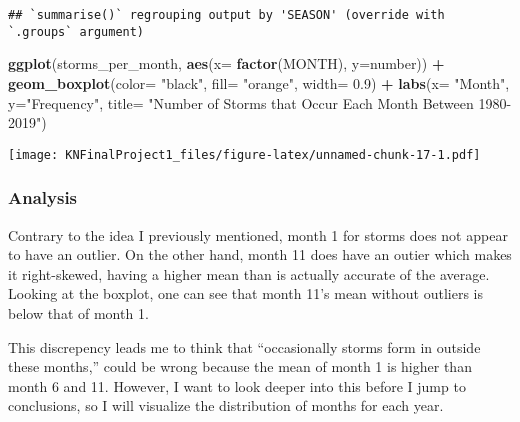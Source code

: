 \documentclass[
]{article}
\newenvironment{Shaded}{\begin{snugshade}}{\end{snugshade}}
\newcommand{\DataTypeTok}[1]{\textcolor[rgb]{0.13,0.29,0.53}{#1}}
\newcommand{\FloatTok}[1]{\textcolor[rgb]{0.00,0.00,0.81}{#1}}
\newcommand{\KeywordTok}[1]{\textcolor[rgb]{0.13,0.29,0.53}{\textbf{#1}}}
\newcommand{\NormalTok}[1]{#1}
\newcommand{\OperatorTok}[1]{\textcolor[rgb]{0.81,0.36,0.00}{\textbf{#1}}}
\newcommand{\StringTok}[1]{\textcolor[rgb]{0.31,0.60,0.02}{#1}}
\begin{document}
\begin{verbatim}
## `summarise()` regrouping output by 'SEASON' (override with `.groups` argument)
\end{verbatim}

\begin{Shaded}
\begin{Highlighting}[]
\KeywordTok{ggplot}\NormalTok{(storms_per_month, }\KeywordTok{aes}\NormalTok{(}\DataTypeTok{x=} \KeywordTok{factor}\NormalTok{(MONTH), }\DataTypeTok{y=}\NormalTok{number)) }\OperatorTok{+}
\StringTok{  }\KeywordTok{geom_boxplot}\NormalTok{(}\DataTypeTok{color=} \StringTok{"black"}\NormalTok{, }\DataTypeTok{fill=} \StringTok{"orange"}\NormalTok{, }\DataTypeTok{width=} \FloatTok{0.9}\NormalTok{) }\OperatorTok{+}\StringTok{ }
\StringTok{  }\KeywordTok{labs}\NormalTok{(}\DataTypeTok{x=} \StringTok{"Month"}\NormalTok{, }\DataTypeTok{y=}\StringTok{"Frequency"}\NormalTok{, }\DataTypeTok{title=} \StringTok{"Number of Storms that Occur Each Month Between 1980-2019"}\NormalTok{)}
\end{Highlighting}
\end{Shaded}

\texttt{[image: KNFinalProject1\_files/figure-latex/unnamed-chunk-17-1.pdf]}

\hypertarget{analysis-1}{%
\subsubsection{Analysis}\label{analysis-1}}

Contrary to the idea I previously mentioned, month 1 for storms does not
appear to have an outlier. On the other hand, month 11 does have an
outier which makes it right-skewed, having a higher mean than is
actually accurate of the average. Looking at the boxplot, one can see
that month 11's mean without outliers is below that of month 1.

This discrepency leads me to think that ``occasionally storms form in
outside these months,'' could be wrong because the mean of month 1 is
higher than month 6 and 11. However, I want to look deeper into this
before I jump to conclusions, so I will visualize the distribution of
months for each year.
\end{document}
